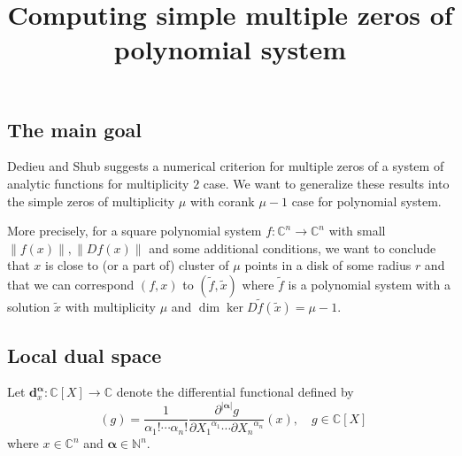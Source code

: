 \documentclass[12pt,oneside,reqno]{amsart}
\title{Computing simple multiple zeros of polynomial system}
\theoremstyle{definition}
\DeclareMathOperator{\diffop}{\mathbf{d}^\mathbf{\alpha}_x}
\begin{document}
\maketitle
\subsection{The main goal}
Dedieu and Shub \cite{dedieu2001simple} suggests a numerical criterion for multiple zeros of a system of analytic functions for multiplicity $2$ case. We want to generalize these results into the simple zeros of multiplicity $\mu$ with corank $\mu-1$ case for polynomial system.

More precisely, for a square polynomial system $f:\mathbb{C}^n\rightarrow \mathbb{C}^n$ with small $\|f(x)\|,\|Df(x)\|$ and some additional conditions, we want to conclude that $x$ is close to (or a part of) cluster of $\mu$ points in a disk of some radius $r$ and that we can correspond $(f,x)$ to $(\tilde{f},\tilde{x})$ where $\tilde{f}$ is a polynomial system with a solution $\tilde{x}$ with multiplicity $\mu$ and $\dim\ker D\tilde{f}(\tilde{x})=\mu - 1$.

\subsection{Local dual space}
Let $\mathbf{d}^\mathbf{\alpha}_x :\mathbb{C}[X]\rightarrow \mathbb{C}$ denote the differential functional defined by
\[\diffop(g)=\frac{1}{\alpha_1!\cdots \alpha_n!}\frac{\partial^{|\mathbf{\alpha}|}g}{\partial {X_1}^{\alpha_1}\cdots \partial{X_n}^{\alpha_n}}(x), \quad g\in \mathbb{C}[X]\]
where $x\in \mathbb{C}^n$ and $\mathbf{\alpha}\in \mathbb{N}^n$.
\end{document}
